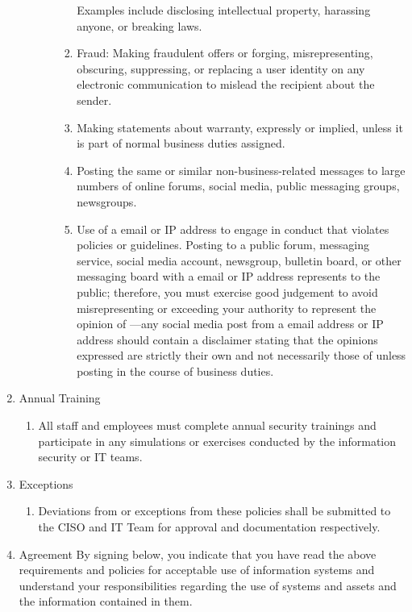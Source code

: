 \documentclass[../main.tex]{subfiles}
\begin{document}
\begin{enumerate}
\begin{enumerate}
\begin{enumerate}
\begin{enumerate}
                Examples include disclosing intellectual property, harassing anyone, or breaking laws.
                \item Fraud: Making fraudulent offers or forging, misrepresenting, obscuring, suppressing, or replacing a user identity on any electronic communication to mislead the recipient
                about the sender.
                \item Making statements about warranty, expressly or implied, unless it is part of normal business duties assigned.
                \item Posting the same or similar non-business-related messages to large numbers of online forums, social media, public messaging groups, newsgroups.
                \item Use of a \CompanyName{} email or IP address to engage in conduct that violates \CompanyName{} policies or guidelines. Posting to a public forum, messaging service,
                social media account, newsgroup, bulletin board, or other messaging board with a \CompanyName{} email or IP address represents \CompanyName{} to the public; therefore, you must
                exercise good judgement to avoid misrepresenting or exceeding your authority to represent the opinion of \CompanyName—any social media post from a \CompanyName{} email address
                or IP address should contain a disclaimer stating that the opinions expressed are strictly their own and not necessarily those of \CompanyName{} unless posting in the course
                of business duties.
            \end{enumerate}
        \end{enumerate}
    \end{enumerate}
    \item Annual Training
    \begin{enumerate}
        \item All staff and employees must complete annual security trainings and participate in any simulations or exercises conducted by the information security or IT teams.
    \end{enumerate}
    \item Exceptions
    \begin{enumerate}
        \item Deviations from or exceptions from these policies shall be submitted to the CISO and IT Team for approval and documentation respectively.
    \end{enumerate}
    \item Agreement
    \newline
    By signing below, you indicate that you have read the above requirements and policies for acceptable use of \CompanyName{}  information systems and understand your responsibilities regarding the
    use of \CompanyName{}  systems and assets and the information contained in them.
\end{enumerate}
\end{document}
